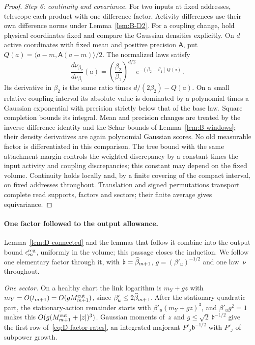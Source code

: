 \begin{proof}
\emph{Step 6: continuity and covariance.} For two inputs at fixed addresses, telescope each product with one difference factor. Activity differences use their own difference norms under Lemma~\ref{lem:B-D2}. For a coupling change, hold physical coordinates fixed and compare the Gaussian densities explicitly. On $d$ active coordinates with fixed mean and positive precision $\mathsf A$, put $Q(a)=\langle a-m,\mathsf A(a-m)\rangle/2$. The normalized laws satisfy
\begin{equation*}
\frac{d\nu_{\beta_2}}{d\nu_{\beta_1}}(a)
=\left(\frac{\beta_2}{\beta_1}\right)^{d/2}
 e^{-(\beta_2-\beta_1)Q(a)}\,.
\end{equation*}
Its derivative in $\beta_2$ is the same ratio times $d/(2\beta_2)-Q(a)$. On a small relative coupling interval its absolute value is dominated by a polynomial times a Gaussian exponential with precision strictly below that of the base law. Square completion bounds its integral. Mean and precision changes are treated by the inverse difference identity and the Schur bounds of Lemma~\ref{lem:B-windows}; their density derivatives are again polynomial Gaussian scores. No old measurable factor is differentiated in this comparison. The tree bound with the same attachment margin controls the weighted discrepancy by a constant times the input activity and coupling discrepancies; this constant may depend on the fixed volume. Continuity holds locally and, by a finite covering of the compact interval, on fixed addresses throughout. Translation and signed permutations transport complete read supports, factors and sectors; their finite average gives equivariance.
\end{proof}

\paragraph{One factor followed to the output allowance.} Lemma~\ref{lem:D-connected} and the lemmas that follow it combine into the output bound $\epsilon^{\rm reg}_m$, uniformly in the volume; this passage closes the induction. We follow one elementary factor through it, with $\mathfrak b=\widehat{\beta}_{m+1}$, $g=(\beta'_u)^{-1/2}$ and one law~$\nu$ throughout.

\emph{One sector.} On a healthy chart the link logarithm is $m_Y+gz$ with $m_Y=O(t_{m+1})=O(gM^{\mathrm{cut}}_{m+1})$, since $\beta'_u\le2\widehat{\beta}_{m+1}$. After the stationary quadratic part, the stationary-action remainder starts with $\beta'_u(m_Y+gz)^3$, and $\beta'_ug^2=1$ makes this $O(g(M^{\mathrm{cut}}_{m+1}+|z|)^3)$. Gaussian moments of~$z$ and $g\le\sqrt2\,\mathfrak b^{-1/2}$ give the first row of~\eqref{eq:D-factor-rates}, an integrated majorant $P'_j\mathfrak b^{-1/2}$ with $P'_j$ of subpower growth.

